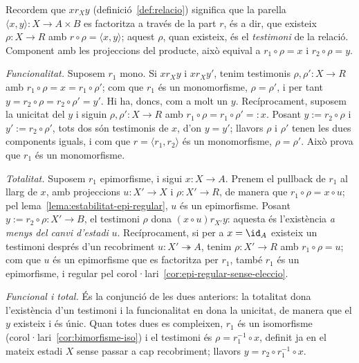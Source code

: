 \begin{prova}
Recordem que \(x\mathrel{r_X}y\) (definició~\ref{def:relacio}) significa que la parella
\(\langle x,y\rangle\colon X\to A\times B\) es factoritza a través de la
part \(r\), és a dir, que existeix \(\rho\colon X\to R\) amb
\(r\circ\rho=\langle x,y\rangle\); aquest \(\rho\), quan existeix, és el
\emph{testimoni} de la relació. Component amb les projeccions del
producte, això equival a \(r_1\circ\rho=x\) i \(r_2\circ\rho=y\).

\emph{Funcionalitat.} Suposem \(r_1\) mono. Si \(x\mathrel{r_X}y\) i
\(x\mathrel{r_X}y'\), tenim testimonis \(\rho,\rho'\colon X\to R\) amb
\(r_1\circ\rho=x=r_1\circ\rho'\); com que \(r_1\) és un monomorfisme,
\(\rho=\rho'\), i per tant \(y=r_2\circ\rho=r_2\circ\rho'=y'\). Hi ha,
doncs, com a molt un \(y\). Recíprocament, suposem la unicitat del \(y\) i
siguin \(\rho,\rho'\colon X\to R\) amb \(r_1\circ\rho=r_1\circ\rho'=:x\).
Posant \(y:=r_2\circ\rho\) i \(y':=r_2\circ\rho'\), tots dos són
testimonis de \(x\), d'on \(y=y'\); llavors \(\rho\) i \(\rho'\) tenen les
dues components iguals, i com que \(r=\langle r_1,r_2\rangle\) és un
monomorfisme, \(\rho=\rho'\). Això prova que \(r_1\) és un monomorfisme.

\emph{Totalitat.} Suposem \(r_1\) epimorfisme, i sigui \(x\colon X\to A\).
Prenem el pullback de \(r_1\) al llarg de \(x\), amb projeccions
\(u\colon X'\to X\) i \(\rho\colon X'\to R\), de manera que
\(r_1\circ\rho=x\circ u\); pel lema~\ref{lema:estabilitat-epi-regular},
\(u\) és un epimorfisme. Posant \(y:=r_2\circ\rho\colon X'\to B\), el
testimoni \(\rho\) dona \((x\circ u)\mathrel{r_{X'}}y\): aquesta és
l'existència \emph{a menys del canvi d'estadi} \(u\). Recíprocament, si
per a \(x=\id_A\) existeix un testimoni després d'un recobriment
\(u\colon X'\twoheadrightarrow A\), tenim \(\rho\colon X'\to R\) amb
\(r_1\circ\rho=u\); com que \(u\) és un epimorfisme que es factoritza per
\(r_1\), també \(r_1\) és un epimorfisme, i regular pel
corol·lari~\ref{cor:epi-regular-sense-eleccio}.

\emph{Funcional i total.} És la conjunció de les dues anteriors: la
totalitat dona l'existència d'un testimoni i la funcionalitat en dona la
unicitat, de manera que el \(y\) existeix i és únic. Quan totes dues es
compleixen, \(r_1\) és un isomorfisme
(corol·lari~\ref{cor:bimorfisme-iso}) i el testimoni és
\(\rho=r_1^{-1}\circ x\), definit ja en el mateix estadi \(X\) sense
passar a cap recobriment; llavors \(y=r_2\circ r_1^{-1}\circ x\).
\end{prova}

